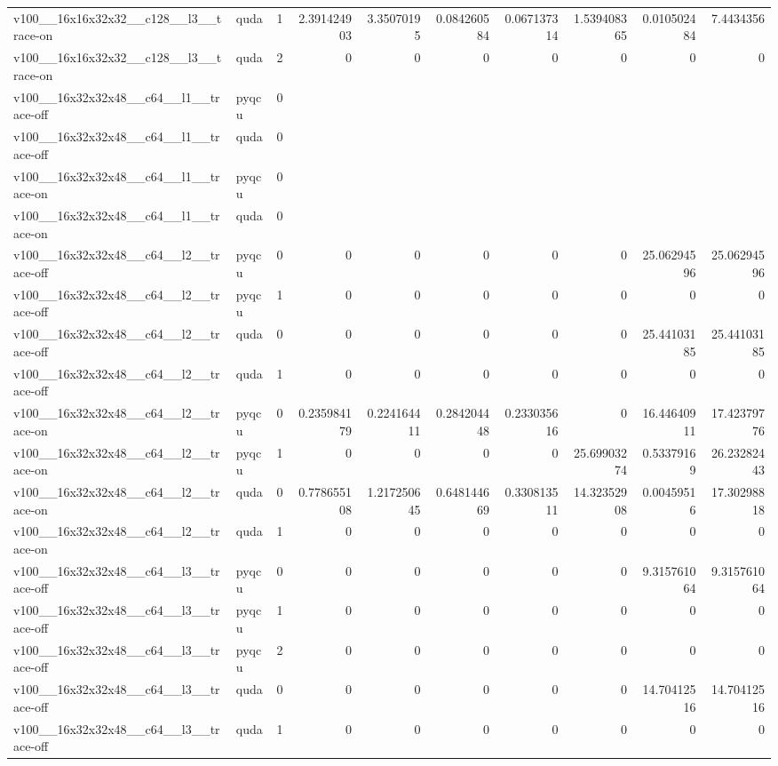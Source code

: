 \begin{table}[htbp]
\begin{tabular}{@{}llrrrrrrrr@{}}
v100\_\_16x16x32x32\_\_c128\_\_l3\_\_trace-on & quda & 1 & 2.391424903 & 3.35070195 & 0.084260584 & 0.067137314 & 1.539408365 & 0.010502484 & 7.4434356 \\
v100\_\_16x16x32x32\_\_c128\_\_l3\_\_trace-on & quda & 2 & 0 & 0 & 0 & 0 & 0 & 0 & 0 \\
v100\_\_16x32x32x48\_\_c64\_\_l1\_\_trace-off & pyqcu & 0 &  &  &  &  &  &  &  \\
v100\_\_16x32x32x48\_\_c64\_\_l1\_\_trace-off & quda & 0 &  &  &  &  &  &  &  \\
v100\_\_16x32x32x48\_\_c64\_\_l1\_\_trace-on & pyqcu & 0 &  &  &  &  &  &  &  \\
v100\_\_16x32x32x48\_\_c64\_\_l1\_\_trace-on & quda & 0 &  &  &  &  &  &  &  \\
v100\_\_16x32x32x48\_\_c64\_\_l2\_\_trace-off & pyqcu & 0 & 0 & 0 & 0 & 0 & 0 & 25.06294596 & 25.06294596 \\
v100\_\_16x32x32x48\_\_c64\_\_l2\_\_trace-off & pyqcu & 1 & 0 & 0 & 0 & 0 & 0 & 0 & 0 \\
v100\_\_16x32x32x48\_\_c64\_\_l2\_\_trace-off & quda & 0 & 0 & 0 & 0 & 0 & 0 & 25.44103185 & 25.44103185 \\
v100\_\_16x32x32x48\_\_c64\_\_l2\_\_trace-off & quda & 1 & 0 & 0 & 0 & 0 & 0 & 0 & 0 \\
v100\_\_16x32x32x48\_\_c64\_\_l2\_\_trace-on & pyqcu & 0 & 0.235984179 & 0.224164411 & 0.284204448 & 0.233035616 & 0 & 16.44640911 & 17.42379776 \\
v100\_\_16x32x32x48\_\_c64\_\_l2\_\_trace-on & pyqcu & 1 & 0 & 0 & 0 & 0 & 25.69903274 & 0.53379169 & 26.23282443 \\
v100\_\_16x32x32x48\_\_c64\_\_l2\_\_trace-on & quda & 0 & 0.778655108 & 1.217250645 & 0.648144669 & 0.330813511 & 14.32352908 & 0.00459516 & 17.30298818 \\
v100\_\_16x32x32x48\_\_c64\_\_l2\_\_trace-on & quda & 1 & 0 & 0 & 0 & 0 & 0 & 0 & 0 \\
v100\_\_16x32x32x48\_\_c64\_\_l3\_\_trace-off & pyqcu & 0 & 0 & 0 & 0 & 0 & 0 & 9.315761064 & 9.315761064 \\
v100\_\_16x32x32x48\_\_c64\_\_l3\_\_trace-off & pyqcu & 1 & 0 & 0 & 0 & 0 & 0 & 0 & 0 \\
v100\_\_16x32x32x48\_\_c64\_\_l3\_\_trace-off & pyqcu & 2 & 0 & 0 & 0 & 0 & 0 & 0 & 0 \\
v100\_\_16x32x32x48\_\_c64\_\_l3\_\_trace-off & quda & 0 & 0 & 0 & 0 & 0 & 0 & 14.70412516 & 14.70412516 \\
v100\_\_16x32x32x48\_\_c64\_\_l3\_\_trace-off & quda & 1 & 0 & 0 & 0 & 0 & 0 & 0 & 0 \\

\end{tabular}
\end{table}
